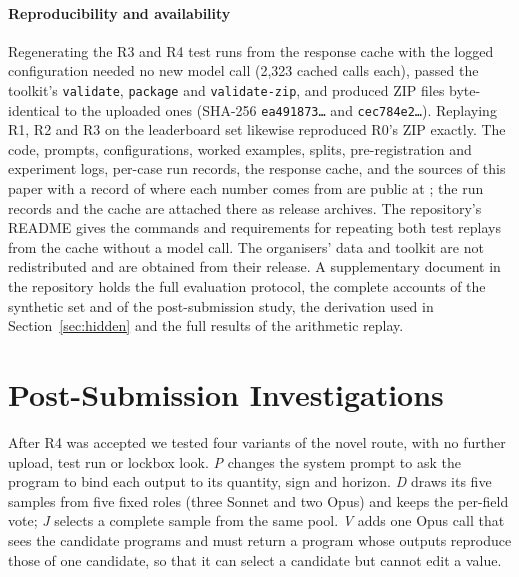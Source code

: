 \documentclass[conference]{IEEEtran}
\newcommand{\id}[1]{\texttt{#1}}
\begin{document}
\paragraph*{Reproducibility and availability}
Regenerating the R3 and R4 test runs from the response cache with the logged configuration needed no new model call (2,323 cached calls each), passed the toolkit's \id{validate}, \id{package} and \id{validate-zip}, and produced ZIP files byte-identical to the uploaded ones (SHA-256 \id{ea491873\ldots} and \id{cec784e2\ldots}). Replaying R1, R2 and R3 on the leaderboard set likewise reproduced R0's ZIP exactly. The code, prompts, configurations, worked examples, splits, pre-registration and experiment logs, per-case run records, the response cache, and the sources of this paper with a record of where each number comes from are public at \repourl; the run records and the cache are attached there as release archives. The repository's README gives the commands and requirements for repeating both test replays from the cache without a model call. The organisers' data and toolkit are not redistributed and are obtained from their release. A supplementary document in the repository holds the full evaluation protocol, the complete accounts of the synthetic set and of the post-submission study, the derivation used in Section~\ref{sec:hidden} and the full results of the arithmetic replay.

\section{Post-Submission Investigations}\label{sec:post}

After R4 was accepted we tested four variants of the novel route, with no further upload, test run or lockbox look. \emph{P} changes the system prompt to ask the program to bind each output to its quantity, sign and horizon. \emph{D} draws its five samples from five fixed roles (three Sonnet and two Opus) and keeps the per-field vote; \emph{J} selects a complete sample from the same pool. \emph{V} adds one Opus call that sees the candidate programs and must return a program whose outputs reproduce those of one candidate, so that it can select a candidate but cannot edit a value.
\end{document}
